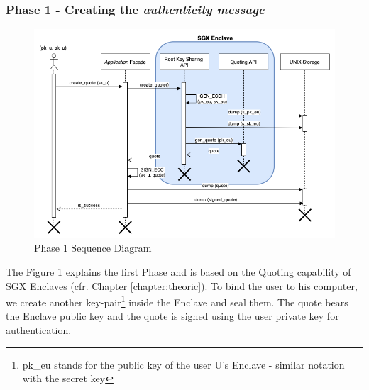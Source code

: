 \documentclass[../main.tex]{subfiles}
\begin{document}
\subsubsection{Phase 1 - Creating the \textit{authenticity message}}
\begin{figure}[h]
    \centering
    \includegraphics[width=\textwidth]{../../images/lauxus/create_quote}
    
    \caption{Phase 1 Sequence Diagram}
    \label{figure:lauxus:create_quote}
\end{figure}
\par The Figure \ref{figure:lauxus:create_quote} explains the first Phase and is based on the Quoting capability of SGX Enclaves (cfr. Chapter \ref{chapter:theoric}). To bind the user to his computer, we create another key-pair\footnote{pk\_eu stands for the public key of the user U's Enclave - similar notation with the secret key} inside the Enclave and seal them. The quote bears the Enclave public key and the quote is signed using the user private key for authentication.
\end{document}
